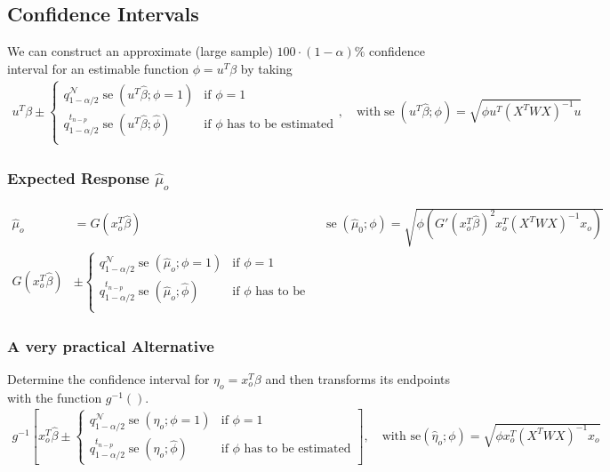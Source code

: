 \subsection{Confidence Intervals}
We can construct an approximate (large sample) $100\cdot(1-\alpha)\%$
confidence interval for an estimable function $\phi = u^T \beta$ by taking
\begin{align*}
u^T \beta
\pm
\begin{cases}
q_{1-\alpha/2}^\mathcal{N} \operatorname{se}\left(u^T\widehat\beta;
\phi=1\right)
 &
\text{if } \phi=1
\\
q_{1-\alpha/2}^{t_{n-p}} \operatorname{se}\left(u^T\widehat\beta; \widehat\phi
\right)
 &
\text{if $\phi$ has to be estimated}
\\
\end{cases}
,\quad
\text{with}
\operatorname{se}(u^T\widehat\beta;\phi)
=
\sqrt{\phi u^T \left( X^T W X\right)^{-1} u}
\end{align*}

\subsubsection{Expected Response $\widehat\mu_o$}
\begin{align*}
\widehat{\mu}_o
 & =
G\left(x_o^T \widehat\beta\right)
 &
\operatorname{se}(\widehat\mu_0;\phi)
=
\sqrt{\phi \left(
G'(x_o^T \widehat\beta)^2 x_o^T \left(X^T W X\right)^{-1} x_o
\right)}
\\
G\left(x_o^T \widehat\beta\right)
 & \pm
\begin{cases}
q_{1-\alpha/2}^\mathcal{N} \operatorname{se}\left(\widehat\mu_o; \phi=1\right)
 &
\text{if } \phi=1
\\
q_{1-\alpha/2}^{t_{n-p}} \operatorname{se}\left(\widehat\mu_o; \widehat\phi
\right)
 &
\text{if $\phi$ has to be estimated}
\\
\end{cases}
\end{align*}

\subsubsection{A very practical Alternative}
Determine the confidence interval for $\eta_o = x_o^T \beta$ and then
transforms its endpoints with the function $g^{-1}()$.
\begin{align*}
g^{-1} \left[
x_o^T \widehat\beta
\pm
\begin{cases}
q_{1-\alpha/2}^\mathcal{N} \operatorname{se}\left(\eta_o; \phi=1\right)
 &
\text{if } \phi=1
\\
q_{1-\alpha/2}^{t_{n-p}} \operatorname{se}\left(\eta_o; \widehat\phi \right)
 &
\text{if $\phi$ has to be estimated}
\end{cases}
\right]
,\quad
\text{with se}(\widehat\eta_o; \phi)
=
\sqrt{\phi x_o^T \left(X^T W X\right)^{-1} x_o}
\end{align*}

